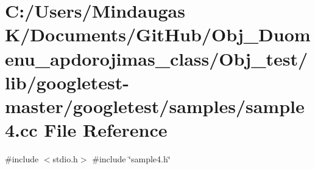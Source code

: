 \hypertarget{_obj__test_2lib_2googletest-master_2googletest_2samples_2sample4_8cc}{}\section{C\+:/\+Users/\+Mindaugas K/\+Documents/\+Git\+Hub/\+Obj\+\_\+\+Duomenu\+\_\+apdorojimas\+\_\+class/\+Obj\+\_\+test/lib/googletest-\/master/googletest/samples/sample4.cc File Reference}
\label{_obj__test_2lib_2googletest-master_2googletest_2samples_2sample4_8cc}
{\ttfamily \#include $<$stdio.\+h$>$}\newline
{\ttfamily \#include \char`\"{}sample4.\+h\char`\"{}}\newline
